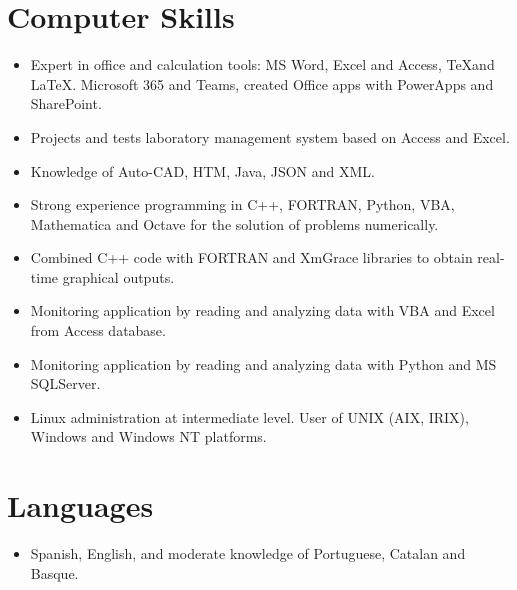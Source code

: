 \documentclass{article}
\begin{document}
\section*{Computer Skills}

\begin{itemize}\itemsep 0pt
\item Expert in office and calculation tools: MS Word, Excel and Access, \TeX and \LaTeX.
Microsoft 365 and Teams, created Office apps with PowerApps and SharePoint.

\item Projects and tests laboratory management system based on Access and Excel.

\item Knowledge of Auto-CAD, HTM, Java, JSON and XML.

\item Strong experience programming in C++, FORTRAN, Python, VBA, Mathematica and Octave for the solution of problems numerically.

\item Combined C++ code with FORTRAN and XmGrace libraries to obtain real-time graphical outputs.

\item Monitoring application by reading and analyzing data with VBA and Excel from Access database.

\item Monitoring application by reading and analyzing data with Python and MS SQLServer.

\item Linux administration at intermediate level.  
User of UNIX (AIX, IRIX), Windows and Windows NT platforms.
\end{itemize}


\section*{Languages}
\begin{itemize}\itemsep 0pt
\item Spanish, English, and moderate knowledge of Portuguese, 
Catalan and Basque.
\end{itemize}

\end{document}
